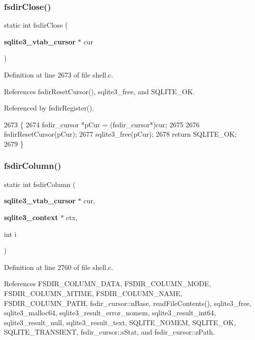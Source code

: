 \subsubsection{fsdir\+Close()}
{\footnotesize\ttfamily static int fsdir\+Close (\begin{DoxyParamCaption}\item[{\textbf{ sqlite3\+\_\+vtab\+\_\+cursor} $\ast$}]{cur }\end{DoxyParamCaption})\hspace{0.3cm}{\ttfamily [static]}}



Definition at line 2673 of file shell.\+c.



References fsdir\+Reset\+Cursor(), sqlite3\+\_\+free, and S\+Q\+L\+I\+T\+E\+\_\+\+OK.



Referenced by fsdir\+Register().


\begin{DoxyCode}
2673                                                \{
2674   fsdir_cursor *pCur = (fsdir_cursor*)cur;
2675 
2676   fsdirResetCursor(pCur);
2677   sqlite3_free(pCur);
2678   \textcolor{keywordflow}{return} SQLITE_OK;
2679 \}
\end{DoxyCode}
\mbox{\label{shell_8c_a50d346f5186444b90b2293d0121523e2}} 
\subsubsection{fsdir\+Column()}
{\footnotesize\ttfamily static int fsdir\+Column (\begin{DoxyParamCaption}\item[{\textbf{ sqlite3\+\_\+vtab\+\_\+cursor} $\ast$}]{cur,  }\item[{\textbf{ sqlite3\+\_\+context} $\ast$}]{ctx,  }\item[{int}]{i }\end{DoxyParamCaption})\hspace{0.3cm}{\ttfamily [static]}}



Definition at line 2760 of file shell.\+c.



References F\+S\+D\+I\+R\+\_\+\+C\+O\+L\+U\+M\+N\+\_\+\+D\+A\+TA, F\+S\+D\+I\+R\+\_\+\+C\+O\+L\+U\+M\+N\+\_\+\+M\+O\+DE, F\+S\+D\+I\+R\+\_\+\+C\+O\+L\+U\+M\+N\+\_\+\+M\+T\+I\+ME, F\+S\+D\+I\+R\+\_\+\+C\+O\+L\+U\+M\+N\+\_\+\+N\+A\+ME, F\+S\+D\+I\+R\+\_\+\+C\+O\+L\+U\+M\+N\+\_\+\+P\+A\+TH, fsdir\+\_\+cursor\+::n\+Base, read\+File\+Contents(), sqlite3\+\_\+free, sqlite3\+\_\+malloc64, sqlite3\+\_\+result\+\_\+error\+\_\+nomem, sqlite3\+\_\+result\+\_\+int64, sqlite3\+\_\+result\+\_\+null, sqlite3\+\_\+result\+\_\+text, S\+Q\+L\+I\+T\+E\+\_\+\+N\+O\+M\+EM, S\+Q\+L\+I\+T\+E\+\_\+\+OK, S\+Q\+L\+I\+T\+E\+\_\+\+T\+R\+A\+N\+S\+I\+E\+NT, fsdir\+\_\+cursor\+::s\+Stat, and fsdir\+\_\+cursor\+::z\+Path.



